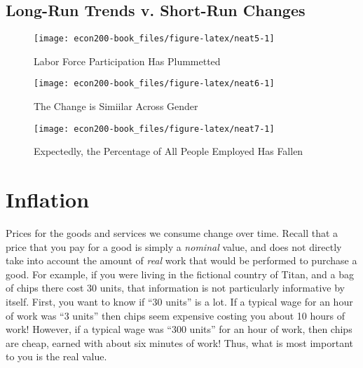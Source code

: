 \documentclass[
]{book}
\begin{document}
\hypertarget{long-run-trends-v.-short-run-changes}{%
\section{Long-Run Trends v. Short-Run Changes}\label{long-run-trends-v.-short-run-changes}}

\begin{figure}

{\centering \texttt{[image: econ200-book\_files/figure-latex/neat5-1]} 

}

\caption{Labor Force Participation Has Plummetted}\label{fig:neat5}
\end{figure}

\begin{figure}

{\centering \texttt{[image: econ200-book\_files/figure-latex/neat6-1]} 

}

\caption{The Change is Simiilar Across Gender}\label{fig:neat6}
\end{figure}

\begin{figure}

{\centering \texttt{[image: econ200-book\_files/figure-latex/neat7-1]} 

}

\caption{Expectedly, the Percentage of All People Employed Has Fallen}\label{fig:neat7}
\end{figure}

\hypertarget{inflation}{%
\chapter{Inflation}\label{inflation}}

Prices for the goods and services we consume change over time. Recall that a price that you pay for a good is simply a \emph{nominal} value, and does not directly take into account the amount of \emph{real} work that would be performed to purchase a good. For example, if you were living in the fictional country of Titan, and a bag of chips there cost 30 units, that information is not particularly informative by itself. First, you want to know if ``30 units'' is a lot. If a typical wage for an hour of work was ``3 units'' then chips seem expensive costing you about 10 hours of work! However, if a typical wage was ``300 units'' for an hour of work, then chips are cheap, earned with about six minutes of work! Thus, what is most important to you is the real value.
\end{document}

